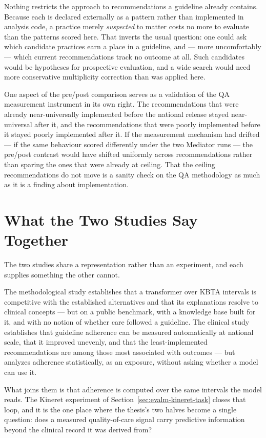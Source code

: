 Nothing restricts the approach to recommendations a guideline already contains. Because each is declared externally as a pattern rather than implemented in analysis code, a practice merely \emph{suspected} to matter costs no more to evaluate than the patterns scored here. That inverts the usual question: one could ask which candidate practices earn a place in a guideline, and --- more uncomfortably --- which current recommendations track no outcome at all. Such candidates would be hypotheses for prospective evaluation, and a wide search would need more conservative multiplicity correction than was applied here.

One aspect of the pre/post comparison serves as a validation of the QA measurement instrument in its own right. The recommendations that were already near-universally implemented before the national release stayed near-universal after it, and the recommendations that were poorly implemented before it stayed poorly implemented after it. If the measurement mechanism had drifted --- if the same behaviour scored differently under the two Mediator runs --- the pre/post contrast would have shifted uniformly across recommendations rather than sparing the ones that were already at ceiling. That the ceiling recommendations do not move is a sanity check on the QA methodology as much as it is a finding about implementation.

\section{What the Two Studies Say Together}
\label{sec:disc-joint}

The two studies share a representation rather than an experiment, and each supplies something the other cannot.

The methodological study establishes that a transformer over KBTA intervals is competitive with the established alternatives and that its explanations resolve to clinical concepts --- but on a public benchmark, with a knowledge base built for it, and with no notion of whether care followed a guideline. The clinical study establishes that guideline adherence can be measured automatically at national scale, that it improved unevenly, and that the least-implemented recommendations are among those most associated with outcomes --- but analyzes adherence statistically, as an exposure, without asking whether a model can use it.

What joins them is that adherence is computed over the same intervals the model reads. The Kineret experiment of Section~\ref{sec:evalm-kineret-task} closes that loop, and it is the one place where the thesis's two halves become a single question: does a measured quality-of-care signal carry predictive information beyond the clinical record it was derived from?

